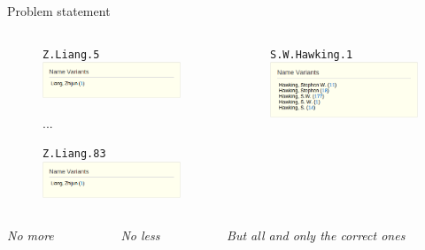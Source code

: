 \documentclass{beamer}
\begin{document}
\begin{frame}{Problem statement}
{\begin{columns}[T]
\begin{column}{0.33\textwidth}
\begin{figure}
\texttt{Z.Liang.5}
\includegraphics[width=\textwidth]{figures/no-less.png}

...

\texttt{Z.Liang.83}
\includegraphics[width=\textwidth]{figures/no-less.png}
\end{figure}
\end{column}
\begin{column}{0.33\textwidth}
\begin{figure}
\texttt{S.W.Hawking.1}
\includegraphics[width=\textwidth]{figures/exact.png}
\end{figure}
\end{column}

\end{columns}

\begin{columns}[T]
\begin{column}{0.33\textwidth}
\begin{center}{\it No more}\end{center}
\end{column}
\begin{column}{0.33\textwidth}
\begin{center}{\it No less}\end{center}
\end{column}
\begin{column}{0.33\textwidth}
\begin{center}{\it But all and only the correct ones}\end{center}
\end{column}
\end{columns}}
\end{frame}
\end{document}
